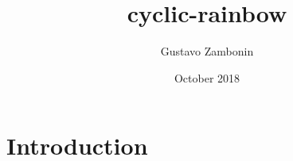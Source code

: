 \documentclass[a4paper,14pt]{extarticle}
\title{cyclic-rainbow}
\author{Gustavo Zambonin}
\date{October 2018}
\begin{document}
\maketitle

\section{Introduction}
\end{document}
